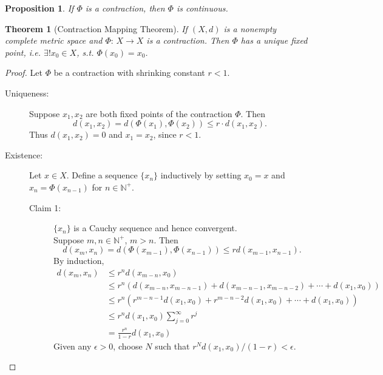 \documentclass[12pt]{article}
\theoremstyle{plain}
\newtheorem{thm}{Theorem}
\newtheorem*{prop}{Proposition}
\theoremstyle{definition}
\begin{document}
\begin{prop}
    If $\Phi$ is a contraction, then $\Phi$ is continuous.
\end{prop}

\begin{thm}[Contraction Mapping Theorem]
    If $(X,d)$ is a nonempty complete metric space and $\Phi:\,X\rightarrow X$ is a
    contraction.
    Then $\Phi$ has a unique fixed point, i.e. $\exists! x_0\in X$, s.t.
    $\Phi(x_0)=x_0$.
\end{thm}
\begin{proof}
    Let $\Phi$ be a contraction with shrinking constant $r<1$.
    \begin{description}
        \item[Uniqueness:]
            Suppose $x_1, x_2$ are both fixed points of the contraction $\Phi$.
            Then
            $$d(x_1,x_2)=d(\Phi(x_1),\Phi(x_2))\leq r\cdot d(x_1,x_2).$$
            Thus $d(x_1,x_2)=0$ and $x_1=x_2$, since $r<1$.
        \item[Existence:]
            Let $x\in X$.
            Define a sequence $\{x_n\}$ inductively by setting $x_0=x$ and
            $x_n=\Phi(x_{n-1})$ for $n\in\mathbb{N}^+$.
            \begin{description}
                \item[Claim 1:]
                    $\{x_n\}$ is a Cauchy sequence and hence convergent.\\
                    Suppose $m,n\in\mathbb{N}^+$, $m>n$.
                    Then
                    $$d(x_m,x_n)=d(\Phi(x_{m-1}),\Phi(x_{n-1}))\leq
                    rd(x_{m-1},x_{n-1}).$$
                    By induction,
                    $$\begin{aligned}
                        d(x_m,x_n)&\leq r^n d(x_{m-n},x_0)\\
                        &\leq r^n\left(d(x_{m-n},x_{m-n-1})+d(x_{m-n-1},x_{m-n-2})
                        +\cdots+d(x_{1},x_{0})\right)\\
                        &\leq r^n\left(r^{m-n-1}d(x_1,x_0)+ r^{m-n-2}d(x_1,x_0)+
                        \cdots+d(x_1,x_0)\right)\\
                        &\leq r^n d(x_1,x_0) \sum_{j=0}^\infty r^j\\
                        &=\frac{r^n}{1-r}d(x_1,x_0)
                    \end{aligned}$$
                    Given any $\epsilon>0$, choose $N$ such that
                    $r^Nd(x_1,x_0)/(1-r)<\epsilon$.

\end{description}
\end{description}
\end{proof}
\end{document}
